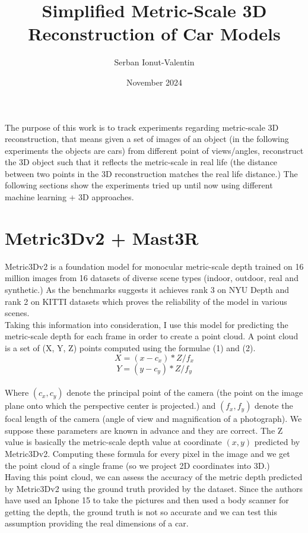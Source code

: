 \documentclass{article}
\title{Simplified Metric-Scale 3D Reconstruction of Car Models }
\author{Serban Ionut-Valentin }
\date{November 2024}
\begin{document}
\maketitle



The purpose of this work is to track experiments regarding metric-scale 3D reconstruction, that means given a set of images of an object (in the following experiments the objects are cars) from different point of views/angles, reconstruct the 3D object such that it reflects the metric-scale in real life (the distance between two points in the 3D reconstruction matches the real life distance.)
The following sections show the experiments tried up until now using different machine learning + 3D approaches.
\section{Metric3Dv2 + Mast3R}
\tab Metric3Dv2 \cite{hu2024metric3d} is a foundation model for monocular metric-scale depth trained on 16 million images from 16 datasets of diverse scene types (indoor, outdoor, real and synthetic.) As the benchmarks suggests it achieves rank 3 on NYU Depth and rank 2 on KITTI datasets which proves the reliability of the model in various scenes.\\
\tab \tab Taking this information into consideration, I use this model for predicting the metric-scale depth for each frame in order to create a point cloud. A point cloud is a set of (X, Y, Z) points computed using the formulae (1) and (2).
\begin{equation}
\label{eqn:point_cloud_formula_x}
X = (x - c_x) * Z / f_x 
\end{equation}
\begin{equation}
\label{eqn:point_cloud_formula_y}
Y = (y - c_y) * Z / f_y
\end{equation}\\
\tab \tab Where $(c_x, c_y)$ denote the principal point of the camera (the point on the image plane onto which the perspective center is projected.) and $(f_x, f_y)$ denote the focal length of the camera (angle of view and magnification of a photograph). We suppose these parameters are known in advance and they are correct. The Z value is basically the metric-scale depth value at coordinate $(x, y)$ predicted by Metric3Dv2. Computing these formula for every pixel in the image and we get the point cloud of a single frame (so we project 2D coordinates into 3D.)\\
\tab \tab Having this point cloud, we can assess the accuracy of the metric depth predicted by Metric3Dv2 using the ground truth provided by the dataset. Since the authors have used an Iphone 15 to take the pictures and then used a body scanner for getting the depth, the ground truth is not so accurate and we can test this assumption providing the real dimensions of a car.\\
\end{document}
